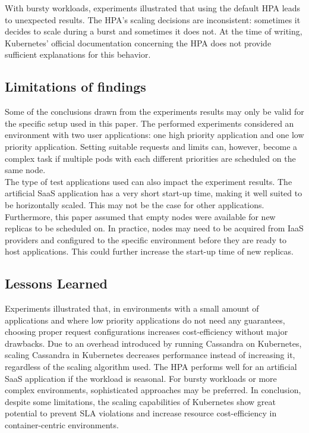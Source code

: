 With bursty workloads, experiments illustrated that using the default HPA leads to unexpected results. The HPA's scaling decisions are inconsistent: sometimes it decides to scale during a burst and sometimes it does not. At the time of writing, Kubernetes' official documentation concerning the HPA does not provide sufficient explanations for this behavior. 

\subsection{Limitations of findings}
Some of the conclusions drawn from the experiments results may only be valid for the specific setup used in this paper. The performed experiments considered an environment with two user applications: one high priority application and one low priority application. Setting suitable requests and limits can, however, become a complex task if multiple pods with each different priorities are scheduled on the same node. \\

The type of test applications used can also impact the experiment results. The artificial SaaS application has a very short start-up time, making it well suited to be horizontally scaled. This may not be the case for other applications. Furthermore, this paper assumed that empty nodes were available for new replicas to be scheduled on. In practice, nodes may need to be acquired from IaaS providers and configured to the specific environment before they are ready to host applications. This could further increase the start-up time of new replicas. 

\subsection{Lessons Learned}
Experiments illustrated that, in environments with a small amount of applications and where low priority applications do not need any guarantees, choosing proper request configurations increases cost-efficiency without major drawbacks. Due to an overhead introduced by running Cassandra on Kubernetes, scaling Cassandra in Kubernetes decreases performance instead of increasing it, regardless of the scaling algorithm used. The HPA performs well for an artificial SaaS application if the workload is seasonal. For bursty workloads or more complex environments, sophisticated approaches may be preferred. In conclusion, despite some limitations, the scaling capabilities of Kubernetes show great potential to prevent SLA violations and increase resource cost-efficiency in container-centric environments.\\

